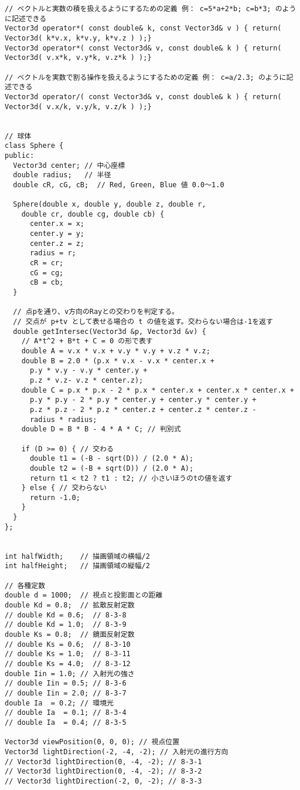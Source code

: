 \documentclass{scrartcl}
\begin{document}
\begin{verbatim}
// ベクトルと実数の積を扱えるようにするための定義 例： c=5*a+2*b; c=b*3; のように記述できる
Vector3d operator*( const double& k, const Vector3d& v ) { return( Vector3d( k*v.x, k*v.y, k*v.z ) );}
Vector3d operator*( const Vector3d& v, const double& k ) { return( Vector3d( v.x*k, v.y*k, v.z*k ) );}

// ベクトルを実数で割る操作を扱えるようにするための定義 例： c=a/2.3; のように記述できる
Vector3d operator/( const Vector3d& v, const double& k ) { return( Vector3d( v.x/k, v.y/k, v.z/k ) );}


// 球体
class Sphere {
public:
  Vector3d center; // 中心座標
  double radius;   // 半径
  double cR, cG, cB;  // Red, Green, Blue 値 0.0〜1.0

  Sphere(double x, double y, double z, double r,
    double cr, double cg, double cb) {
      center.x = x;
      center.y = y;
      center.z = z;
      radius = r;
      cR = cr;
      cG = cg;
      cB = cb;
  }

  // 点pを通り、v方向のRayとの交わりを判定する。
  // 交点が p+tv として表せる場合の t の値を返す。交わらない場合は-1を返す
  double getIntersec(Vector3d &p, Vector3d &v) {
    // A*t^2 + B*t + C = 0 の形で表す
    double A = v.x * v.x + v.y * v.y + v.z * v.z;
    double B = 2.0 * (p.x * v.x - v.x * center.x +
      p.y * v.y - v.y * center.y +
      p.z * v.z- v.z * center.z);
    double C = p.x * p.x - 2 * p.x * center.x + center.x * center.x +
      p.y * p.y - 2 * p.y * center.y + center.y * center.y +
      p.z * p.z - 2 * p.z * center.z + center.z * center.z -
      radius * radius;
    double D = B * B - 4 * A * C; // 判別式

    if (D >= 0) { // 交わる
      double t1 = (-B - sqrt(D)) / (2.0 * A);
      double t2 = (-B + sqrt(D)) / (2.0 * A);
      return t1 < t2 ? t1 : t2; // 小さいほうのtの値を返す
    } else { // 交わらない
      return -1.0;
    }
  }
};


int halfWidth;    // 描画領域の横幅/2
int halfHeight;   // 描画領域の縦幅/2

// 各種定数
double d = 1000;  // 視点と投影面との距離
double Kd = 0.8;  // 拡散反射定数
// double Kd = 0.6;  // 8-3-8
// double Kd = 1.0;  // 8-3-9
double Ks = 0.8;  // 鏡面反射定数
// double Ks = 0.6;  // 8-3-10
// double Ks = 1.0;  // 8-3-11
// double Ks = 4.0;  // 8-3-12
double Iin = 1.0; // 入射光の強さ
// double Iin = 0.5; // 8-3-6
// double Iin = 2.0; // 8-3-7
double Ia  = 0.2; // 環境光
// double Ia  = 0.1; // 8-3-4
// double Ia  = 0.4; // 8-3-5

Vector3d viewPosition(0, 0, 0); // 視点位置
Vector3d lightDirection(-2, -4, -2); // 入射光の進行方向
// Vector3d lightDirection(0, -4, -2); // 8-3-1
// Vector3d lightDirection(0, -4, -2); // 8-3-2
// Vector3d lightDirection(-2, 0, -2); // 8-3-3


\end{verbatim}
\end{document}

